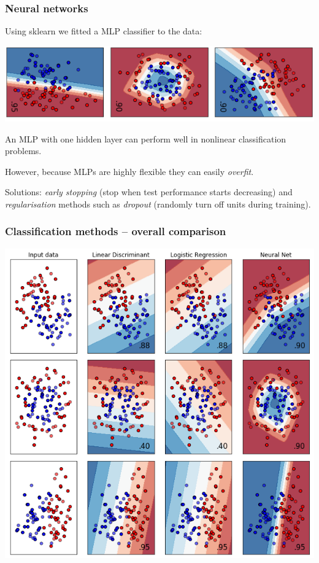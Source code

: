 \documentclass[10pt]{beamer}
\begin{document}
\begin{frame}[fragile]
\frametitle{Neural networks}

\begin{example}
Using sklearn we fitted a MLP classifier to the data: \vspace{5pt}\\	
\centerline{\includegraphics[scale=0.5]{figures/nnet_class.png}}
\end{example}
\small An MLP with one hidden layer can perform well in nonlinear classification problems. 

However, because MLPs are highly flexible  they can easily \emph{overfit}. 

Solutions: \emph{early stopping} (stop when test performance starts decreasing) and \emph{regularisation} methods such as \emph{dropout} (randomly turn off units during training).
\end{frame}




\begin{frame}[fragile]
\frametitle{Classification methods -- overall comparison}

\centerline{\includegraphics[scale=0.35]{figures/classifiers_comparison_this.png}}

\end{frame}
\end{document}
